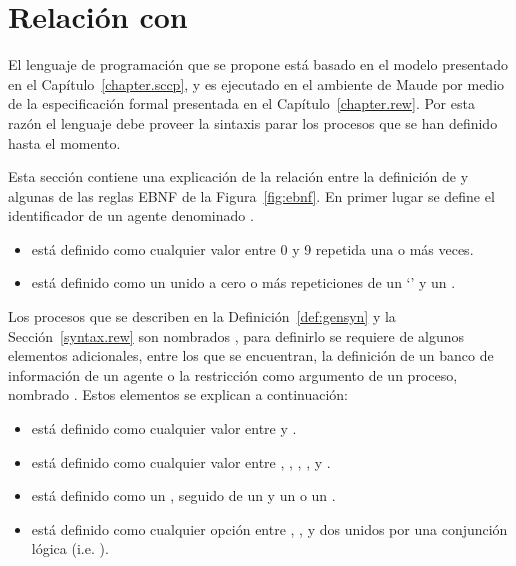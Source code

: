 \section{Relaci\'on con \SCCP}
\label{sccp.lang}

El lenguaje de programaci\'on que se propone est\'a basado en el modelo \SCCP presentado en el Cap\'itulo~\ref{chapter.sccp}, y es ejecutado en el ambiente de Maude por medio de la especificaci\'on formal presentada en el Cap\'itulo~\ref{chapter.rew}. Por esta raz\'on el lenguaje debe proveer la sintaxis parar los procesos que se han definido hasta el momento. 

Esta secci\'on contiene una explicaci\'on de la relaci\'on entre la definici\'on de \SCCP y algunas de las reglas EBNF de la Figura~\ref{fig:ebnf}. En primer lugar se define el identificador de un agente denominado .

\begin{itemize}
\item {} est\'a definido como cualquier valor entre 0 y 9 repetida una o m\'as veces.
\item {} est\'a definido como un  unido a cero o m\'as repeticiones de un `' y un .
\end{itemize}

Los procesos que se describen en la Definici\'on~\ref{def:gensyn} y la Secci\'on~\ref{syntax.rew} son nombrados , para definirlo se requiere de algunos elementos adicionales, entre los que se encuentran, la definici\'on de un banco de informaci\'on de un agente o la restricci\'on como argumento de un proceso, nombrado . Estos elementos se explican a continuaci\'on:

\begin{itemize}
\item {} est\'a definido como cualquier valor entre  y .
\item {} est\'a definido como cualquier valor entre \textterm{>}, \textterm{<}, \textterm{=}, \textterm{=/=}, \textterm{>=} y \textterm{<=}.
\item {} est\'a definido como un , seguido de un  y un  o un . 
\item {} est\'a definido como cualquier opci\'on entre , ,  y dos  unidos por una conjunci\'on l\'ogica (i.e. ).
\end{itemize}

